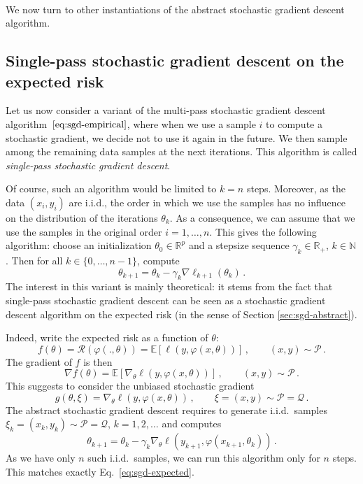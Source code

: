 \documentclass[11pt,reqno]{article}
\newcommand{\N}{\mathbb{N}}
\newcommand{\E}{\mathbb{E}}
\newcommand{\R}{\mathbb{R}}
\newcommand{\cP}{\mathcal{P}}
\newcommand{\cR}{\mathcal{R}}
\newcommand{\cQ}{\mathcal{Q}}
\numberwithin{equation}{section}
\theoremstyle{plain}
\theoremstyle{definition}
\theoremstyle{remark}
\begin{document}
\paragraph{}We now turn to other instantiations of the abstract stochastic gradient descent algorithm.


\subsection{Single-pass stochastic gradient descent on the expected risk}
\label{sec:sgd-expected}

Let us now consider a variant of the multi-pass stochastic gradient descent algorithm~$\eqref{eq:sgd-empirical}$, where when we use a sample $i$ to compute a stochastic gradient, we decide not to use it again in the future. We then sample among the remaining data samples at the next iterations. This algorithm is called \emph{single-pass stochastic gradient descent}.

Of course, such an algorithm would be limited to $k = n$ steps. Moreover, as the data $(x_i,y_i)$ are i.i.d., the order in which we use the samples has no influence on the distribution of the iterations $\theta_k$. As a consequence, we can assume that we use the samples in the original order $i=1, \dots, n$. This gives the following algorithm: choose an initialization $\theta_0 \in \R^p$ and a stepsize sequence $\gamma_k \in \R_+$, $k \in \N$. Then for all $k \in \{0, \dots, n-1\}$, compute
\begin{equation}
	\label{eq:sgd-expected}
	\theta_{k+1} = \theta_{k} - \gamma_k \nabla \ell_{k+1}(\theta_{k}) \, .
\end{equation}
The interest in this variant is mainly theoretical: it stems from the fact that single-pass stochastic gradient descent can be seen as a stochastic gradient descent algorithm on the expected risk (in the sense of Section \ref{sec:sgd-abstract}).

Indeed, write the expected risk as a function of $\theta$:
\begin{equation*}
	f(\theta) = \cR(\varphi(.,\theta)) = \E[\ell(y, \varphi(x, \theta))] \, , \qquad (x,y) \sim \cP \, .
\end{equation*}
The gradient of $f$ is then
\begin{equation*}
	\nabla f(\theta) = \E[\nabla_\theta \ell(y, \varphi(x, \theta))] \, , \qquad (x,y) \sim \cP \, .
\end{equation*}
This suggests to consider the unbiased stochastic gradient
\begin{equation*}
	g(\theta, \xi) = \nabla_\theta \ell(y, \varphi(x, \theta)) \, , \qquad \xi = (x,y) \sim \cP = \cQ \, .
\end{equation*}
The abstract stochastic gradient descent requires to generate i.i.d.~samples $\xi_k = (x_k,y_k) \sim \cP = \cQ$, $k = 1, 2, \dots$ and computes 
\begin{equation*}
	\theta_{k+1} = \theta_{k} - \gamma_k \nabla_\theta \ell(y_{k+1}, \varphi(x_{k+1}, \theta_k)) \, .
\end{equation*}
As we have only $n$ such i.i.d.~samples, we can run this algorithm only for $n$ steps. This matches exactly Eq.~\eqref{eq:sgd-expected}.
\end{document}
